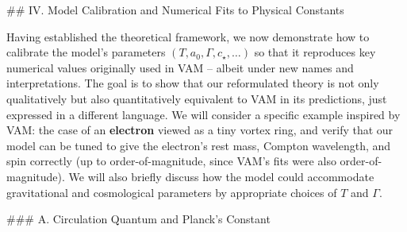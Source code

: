\documentclass[12pt]{article}
\begin{document}
## IV. Model Calibration and Numerical Fits to Physical Constants

Having established the theoretical framework, we now demonstrate how to calibrate the model’s parameters $(T, a_0, \Gamma, c_\star, \ldots)$ so that it reproduces key numerical values originally used in VAM – albeit under new names and interpretations. The goal is to show that our reformulated theory is not only qualitatively but also quantitatively equivalent to VAM in its predictions, just expressed in a different language. We will consider a specific example inspired by VAM: the case of an \textbf{electron} viewed as a tiny vortex ring, and verify that our model can be tuned to give the electron’s rest mass, Compton wavelength, and spin correctly (up to order-of-magnitude, since VAM’s fits were also order-of-magnitude). We will also briefly discuss how the model could accommodate gravitational and cosmological parameters by appropriate choices of $T$ and $\Gamma$.

### A. Circulation Quantum and Planck’s Constant
\end{document}
